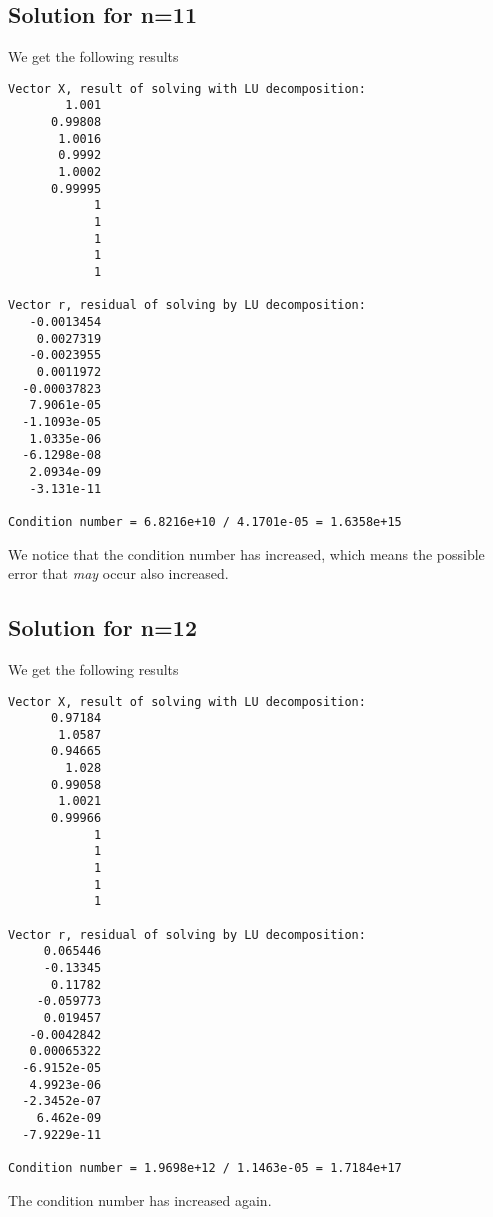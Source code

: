 \subsection{Solution for n=11}
    We get the following results
\begin{lstlisting}
Vector X, result of solving with LU decomposition:
        1.001
      0.99808
       1.0016
       0.9992
       1.0002
      0.99995
            1
            1
            1
            1
            1

Vector r, residual of solving by LU decomposition:
   -0.0013454
    0.0027319
   -0.0023955
    0.0011972
  -0.00037823
   7.9061e-05
  -1.1093e-05
   1.0335e-06
  -6.1298e-08
   2.0934e-09
   -3.131e-11

Condition number = 6.8216e+10 / 4.1701e-05 = 1.6358e+15
\end{lstlisting}
    We notice that the condition number has increased, which means the possible error that \emph{may} occur also increased.


\subsection{Solution for n=12}
    We get the following results
\begin{lstlisting}
Vector X, result of solving with LU decomposition:
      0.97184
       1.0587
      0.94665
        1.028
      0.99058
       1.0021
      0.99966
            1
            1
            1
            1
            1

Vector r, residual of solving by LU decomposition:
     0.065446
     -0.13345
      0.11782
    -0.059773
     0.019457
   -0.0042842
   0.00065322
  -6.9152e-05
   4.9923e-06
  -2.3452e-07
    6.462e-09
  -7.9229e-11

Condition number = 1.9698e+12 / 1.1463e-05 = 1.7184e+17
\end{lstlisting}
    The condition number has increased again.





